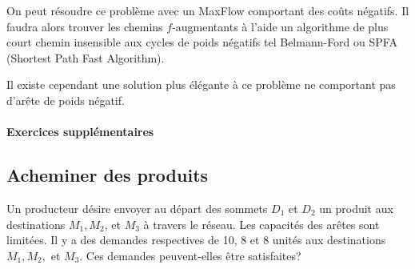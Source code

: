 \begin{solution}
  On peut résoudre ce problème avec un MaxFlow comportant des coûts négatifs.
  Il faudra alors trouver les chemins $f$-augmentants à l'aide un algorithme de plus court chemin insensible
  aux cycles de poids négatifs tel Belmann-Ford ou SPFA (Shortest Path Fast Algorithm).

  Il existe cependant une solution plus élégante à ce problème ne comportant pas d'arête
  de poids négatif.
\end{solution}

\paragraph{Exercices supplémentaires}

\subsection{Acheminer des produits}
Un producteur désire envoyer au départ des sommets $D_1$ et $D_2$ un produit aux destinations $M_1, M_2$, et $M_3$ à travers le réseau. Les capacités des arêtes sont limitées. Il y a des demandes respectives de 10, 8 et 8 unités aux destinations $M_1, M_2,$ et $M_3$. Ces demandes peuvent-elles être satisfaites?

\begin{figure}[h!]
  \centering
\end{figure}

